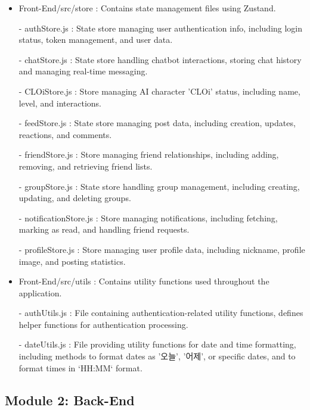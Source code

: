 \begin{itemize}
                    \item Front-End/src/store : Contains state management files using Zustand.
                        \item[-] authStore.js : State store managing user authentication info, including login status, token management, and user data.
                        \item[-] chatStore.js : State store handling chatbot interactions, storing chat history and managing real-time messaging.
                        \item[-] CLOiStore.js : Store managing AI character 'CLOi' status, including name, level, and interactions.
                        \item[-] feedStore.js : State store managing post data, including creation, updates, reactions, and comments.
                        \item[-] friendStore.js : Store managing friend relationships, including adding, removing, and retrieving friend lists.
                        \item[-] groupStore.js : State store handling group management, including creating, updating, and deleting groups.
                        \item[-] notificationStore.js : Store managing notifications, including fetching, marking as read, and handling friend requests.
                        \item[-] profileStore.js : Store managing user profile data, including nickname, profile image, and posting statistics.
                    \vspace{3mm}

                    
                    \item Front-End/src/utils : Contains utility functions used throughout the application.
                        \item[-] authUtils.js : File containing authentication-related utility functions, defines helper functions for authentication processing.
                        \item[-] dateUtils.js : File providing utility functions for date and time formatting, including methods to format dates as '오늘', '어제', or specific dates, and to format times in `HH:MM` format.
                    \vspace{3mm}

                \end{itemize}    
        
    \subsection{Module 2: Back-End}
